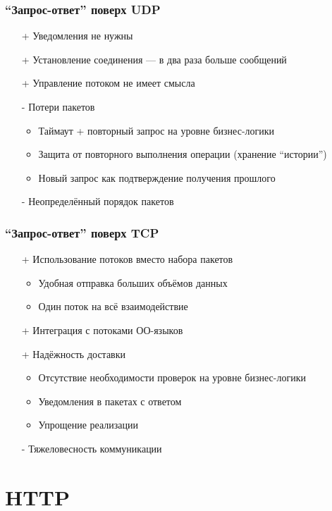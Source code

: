\documentclass[xetex,mathserif,serif]{beamer}
\begin{document}
	\begin{frame}
		\frametitle{``Запрос-ответ'' поверх UDP}
		\begin{itemize}
			\item[+] Уведомления не нужны
			\item[+] Установление соединения --- в два раза больше сообщений
			\item[+] Управление потоком не имеет смысла
			\item[-] Потери пакетов
			\begin{itemize}
				\item Таймаут + повторный запрос на уровне бизнес-логики
				\item Защита от повторного выполнения операции (хранение ``истории'')
				\item Новый запрос как подтверждение получения прошлого
			\end{itemize}
			\item[-] Неопределённый порядок пакетов
		\end{itemize}
	\end{frame}

	\begin{frame}
		\frametitle{``Запрос-ответ'' поверх TCP}
		\begin{itemize}
			\item[+] Использование потоков вместо набора пакетов
			\begin{itemize}
				\item Удобная отправка больших объёмов данных
				\item Один поток на всё взаимодействие
			\end{itemize}
			\item[+] Интеграция с потоками ОО-языков
			\item[+] Надёжность доставки
			\begin{itemize}
				\item Отсутствие необходимости проверок на уровне бизнес-логики
				\item Уведомления в пакетах с ответом
				\item Упрощение реализации
			\end{itemize}
			\item[-] Тяжеловесность коммуникации
		\end{itemize}
	\end{frame}

	\section{HTTP}
\end{document}
